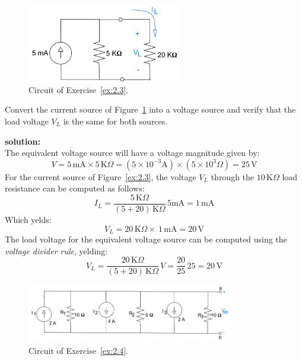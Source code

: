 \begin{figure}[h!]
  \centering
  \includegraphics[width=0.6\textwidth]{"images/Fig-17"}
  \caption{Circuit of Exercise~\ref{ex:2.3}.} 
  \label{Fig:Ex:2.3}
\end{figure}

\begin{exercise}
\label{ex:2.3}
Convert the current source of Figure~\ref{Fig:Ex:2.3} into a voltage source and verify that the load voltage $V_L$ is the same for both sources.

\textbf{solution:}\\
The equivalent voltage source will have a voltage magnitude given by:
\[V = 5\,\textrm{mA} \times 5\,\textrm{K}\Omega = (5\times 10^{-3}\textrm{A})\times (5\times 10^3\Omega)= 25\,\textrm{V}\] 
For the current source of Figure~\ref{ex:2.3}, the voltage $V_L$ through the $10\,\textrm{K}\Omega$ load resistance can be computed as follows:
\[I_L = \frac{5\,\textrm{K}\Omega}{(5 + 20)\,\textrm{K}\Omega} \, 5\textrm{mA}=1\,\textrm{mA}\]
Which yelds:
\[V_L = 20\,\textrm{K}\Omega \times\ 1\,\textrm{mA}= 20\,\textrm{V}\]
The load voltage for the equivalent voltage source can be computed using the \emph{voltage divider rule}, yelding:
\[V_L=\frac{20\,\textrm{K}\Omega}{(5 + 20)\,\textrm{K}\Omega}\,V = \frac{20}{25}\,25= 20\,\textrm{V}\]
\end{exercise}

\begin{figure}[h!]
  \centering
  \includegraphics[width=0.8\textwidth]{"images/Fig-18"}
  \caption{Circuit of Exercise~\ref{ex:2.4}.} 
  \label{Fig:Ex:2.4}
\end{figure}

